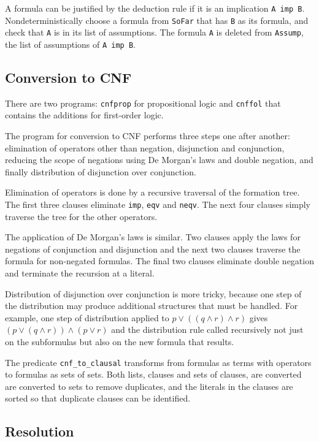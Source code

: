 \documentclass[11pt]{article}
\newcommand*{\p}[1]{\textup{\texttt{#1}}}
\begin{document}
A formula can be justified by the deduction rule if it is an implication
\p{A imp B}. Nondeterministically choose a formula from \p{SoFar} that
has \p{B} as its formula, and check that \p{A} is in its list of
assumptions. The formula \p{A} is deleted from \p{Assump}, the list of
assumptions of \p{A imp B}.



\subsection{Conversion to CNF}\label{s.cnf}

There are two programs: \p{cnfprop} for propositional logic and
\p{cnffol} that contains the additions for first-order logic.

The program for conversion to CNF performs three steps one after
another: elimination of operators other than negation, disjunction and
conjunction, reducing the scope of negations using De Morgan's laws and
double negation, and finally distribution of disjunction over
conjunction.

Elimination of operators is done by a recursive traversal of the
formation tree. The first three clauses eliminate \p{imp}, \p{eqv} and
\p{neqv}. The next four clauses simply traverse the tree for the other
operators.

The application of De Morgan's laws is similar. Two clauses apply the
laws for negations of conjunction and disjunction and the next two
clauses traverse the formula for non-negated formulas. The final two
clauses eliminate double negation and terminate the recursion at a
literal.

Distribution of disjunction over conjunction is more tricky, because one
step of the distribution may produce additional structures that must be
handled. For example, one step of distribution applied to $p \vee
((q\wedge r) \wedge r)$ gives $(p \vee (q\wedge r)) \wedge (p \vee r)$
and the distribution rule called recursively not just on the subformulas
but also on the new formula that results.

The predicate \p{cnf\_to\_clausal} transforms from formulas as terms
with operators to formulas as sets of sets. Both lists, clauses and
sets of clauses, are converted are converted to sets to remove
duplicates, and the literals in the clauses are sorted so that duplicate
clauses can be identified.

\subsection{Resolution}\label{s.resprop}
\end{document}
